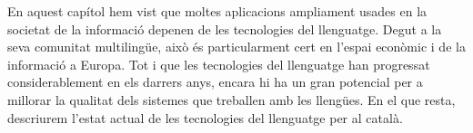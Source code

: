 \begin{multicols}{2}
	En aquest capítol hem vist que moltes aplicacions ampliament usades en la societat de la informació depenen de les tecnologies del llenguatge. Degut a la seva comunitat multilingüe, això és particularment cert en l'espai econòmic i de la informació a Europa. Tot i que les tecnologies del llenguatge han progressat considerablement en els darrers anys, encara hi ha un gran potencial per a millorar la qualitat dels sistemes que treballen amb les llengües. En el que resta, descriurem l'estat actual de les tecnologies del llenguatge per al català. 
\end{multicols}

\clearpage



